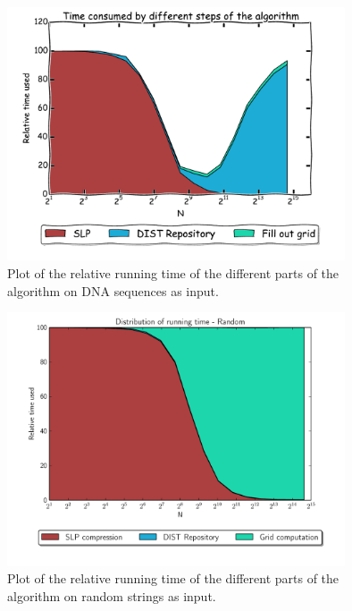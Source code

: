 \documentclass[twoside,11pt,openright]{report}
\begin{document}
\begin{figure}[h!]
  \centering
  \includegraphics[width=10cm]{combined/genome_area_plot}
  \caption{Plot of the relative running time of the different parts of the algorithm on DNA sequences as input.}
  \label{fig:benchmark:relative-runningtime-genome}
\end{figure}

\begin{figure}[h!]
  \centering
  \includegraphics[width=10cm]{combined/random_area_plot}
  \caption{Plot of the relative running time of the different parts of the algorithm on random strings as input.}
  \label{fig:benchmark:relative-runningtime-random}
\end{figure}
\end{document}
